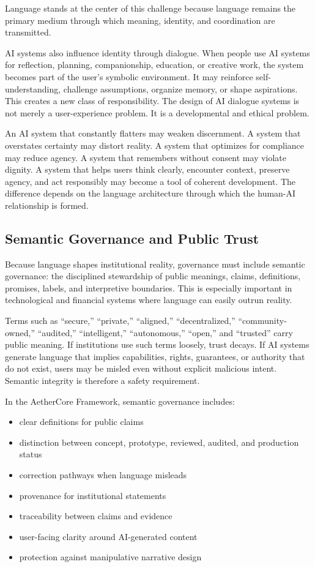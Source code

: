 \documentclass[12pt]{article}
\begin{document}
Language stands at the center of this challenge because language remains the primary medium through which meaning, identity, and coordination are transmitted.

AI systems also influence identity through dialogue. When people use AI systems for reflection, planning, companionship, education, or creative work, the system becomes part of the user's symbolic environment. It may reinforce self-understanding, challenge assumptions, organize memory, or shape aspirations. This creates a new class of responsibility. The design of AI dialogue systems is not merely a user-experience problem. It is a developmental and ethical problem.

An AI system that constantly flatters may weaken discernment. A system that overstates certainty may distort reality. A system that optimizes for compliance may reduce agency. A system that remembers without consent may violate dignity. A system that helps users think clearly, encounter context, preserve agency, and act responsibly may become a tool of coherent development. The difference depends on the language architecture through which the human-AI relationship is formed.

\subsection{Semantic Governance and Public Trust}

Because language shapes institutional reality, governance must include semantic governance: the disciplined stewardship of public meanings, claims, definitions, promises, labels, and interpretive boundaries. This is especially important in technological and financial systems where language can easily outrun reality.

Terms such as ``secure,'' ``private,'' ``aligned,'' ``decentralized,'' ``community-owned,'' ``audited,'' ``intelligent,'' ``autonomous,'' ``open,'' and ``trusted'' carry public meaning. If institutions use such terms loosely, trust decays. If AI systems generate language that implies capabilities, rights, guarantees, or authority that do not exist, users may be misled even without explicit malicious intent. Semantic integrity is therefore a safety requirement.

In the AetherCore Framework, semantic governance includes:

\begin{itemize}
  \item clear definitions for public claims
  \item distinction between concept, prototype, reviewed, audited, and production status
  \item correction pathways when language misleads
  \item provenance for institutional statements
  \item traceability between claims and evidence
  \item user-facing clarity around AI-generated content
  \item protection against manipulative narrative design
\end{itemize}
\end{document}
